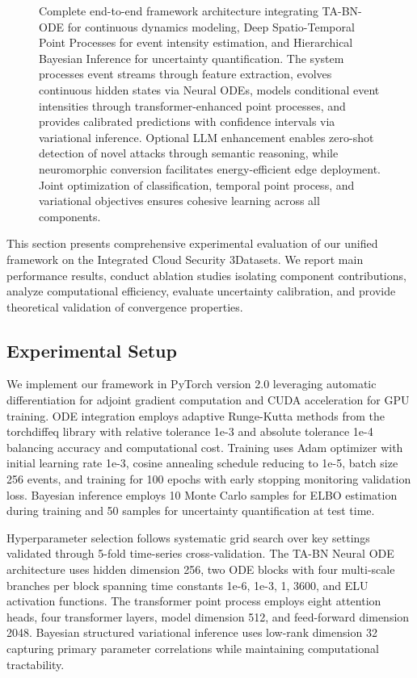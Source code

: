 \documentclass[10pt,journal,compsoc]{IEEEtran}
\begin{document}
\begin{figure*}[!t]
\centering

\caption{Complete end-to-end framework architecture integrating TA-BN-ODE for continuous dynamics modeling, Deep Spatio-Temporal Point Processes for event intensity estimation, and Hierarchical Bayesian Inference for uncertainty quantification. The system processes event streams through feature extraction, evolves continuous hidden states via Neural ODEs, models conditional event intensities through transformer-enhanced point processes, and provides calibrated predictions with confidence intervals via variational inference. Optional LLM enhancement enables zero-shot detection of novel attacks through semantic reasoning, while neuromorphic conversion facilitates energy-efficient edge deployment. Joint optimization of classification, temporal point process, and variational objectives ensures cohesive learning across all components.}
\label{fig:complete_pipeline}
\end{figure*}

This section presents comprehensive experimental evaluation of our unified framework on the Integrated Cloud Security 3Datasets. We report main performance results, conduct ablation studies isolating component contributions, analyze computational efficiency, evaluate uncertainty calibration, and provide theoretical validation of convergence properties.

\subsection{Experimental Setup}

We implement our framework in PyTorch version 2.0 leveraging automatic differentiation for adjoint gradient computation and CUDA acceleration for GPU training. ODE integration employs adaptive Runge-Kutta methods from the torchdiffeq library with relative tolerance 1e-3 and absolute tolerance 1e-4 balancing accuracy and computational cost. Training uses Adam optimizer with initial learning rate 1e-3, cosine annealing schedule reducing to 1e-5, batch size 256 events, and training for 100 epochs with early stopping monitoring validation loss. Bayesian inference employs 10 Monte Carlo samples for ELBO estimation during training and 50 samples for uncertainty quantification at test time.

Hyperparameter selection follows systematic grid search over key settings validated through 5-fold time-series cross-validation. The TA-BN Neural ODE architecture uses hidden dimension 256, two ODE blocks with four multi-scale branches per block spanning time constants {1e-6, 1e-3, 1, 3600}, and ELU activation functions. The transformer point process employs eight attention heads, four transformer layers, model dimension 512, and feed-forward dimension 2048. Bayesian structured variational inference uses low-rank dimension 32 capturing primary parameter correlations while maintaining computational tractability.
\end{document}
